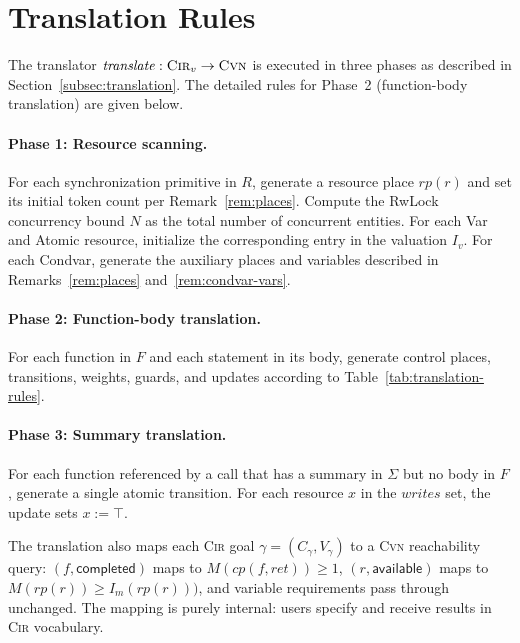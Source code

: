 \documentclass{article}
\begin{document}
\section{Translation Rules}
\label{app:translation-rules}

The translator $\mathit{translate}:\textsc{Cir}_v\to\textsc{Cvn}$ is
executed in three phases as described in
Section~\ref{subsec:translation}.  The detailed rules for Phase~2
(function-body translation) are given below.

\paragraph{Phase 1: Resource scanning.}
For each synchronization primitive in $R$, generate a resource place
$\mathit{rp}(r)$ and set its initial token count per
Remark~\ref{rem:places}.  Compute the RwLock concurrency bound $N$ as
the total number of concurrent entities.  For each \textsf{Var} and
\textsf{Atomic} resource, initialize the corresponding entry in the
valuation $I_v$.  For each \textsf{Condvar}, generate the auxiliary
places and variables described in Remarks~\ref{rem:places}
and~\ref{rem:condvar-vars}.

\paragraph{Phase 2: Function-body translation.}
For each function in $F$ and each statement in its body, generate
control places, transitions, weights, guards, and updates according
to Table~\ref{tab:translation-rules}.

\paragraph{Phase 3: Summary translation.}
For each function referenced by a \textsf{call} that has a summary in
$\Sigma$ but no body in $F$, generate a single atomic transition.
For each resource $x$ in the $\mathit{writes}$ set, the update sets
$x:=\top$.

The translation also maps each \textsc{Cir} goal
$\gamma=(C_\gamma,V_\gamma)$ to a \textsc{Cvn} reachability query:
$(f,\textsf{completed})$ maps to
$M(\mathit{cp}(f,\mathit{ret}))\geq 1$,
$(r,\textsf{available})$ maps to
$M(\mathit{rp}(r))\geq I_m(\mathit{rp}(r)))$, and variable
requirements pass through unchanged.  The mapping is purely internal:
users specify and receive results in \textsc{Cir} vocabulary.
\end{document}
